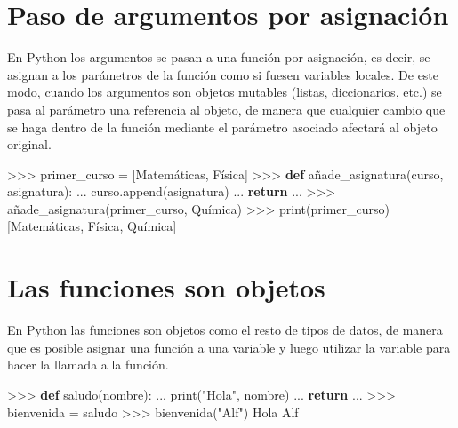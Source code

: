 \documentclass[
  spanish,
  a4paper,
]{scrreport}
\newenvironment{Shaded}{\begin{snugshade}}{\end{snugshade}}
\newcommand{\BuiltInTok}[1]{\textcolor[rgb]{0.00,0.23,0.31}{#1}}
\newcommand{\ControlFlowTok}[1]{\textcolor[rgb]{0.00,0.23,0.31}{\textbf{#1}}}
\newcommand{\KeywordTok}[1]{\textcolor[rgb]{0.00,0.23,0.31}{\textbf{#1}}}
\newcommand{\NormalTok}[1]{\textcolor[rgb]{0.00,0.23,0.31}{#1}}
\newcommand{\OperatorTok}[1]{\textcolor[rgb]{0.37,0.37,0.37}{#1}}
\newcommand{\StringTok}[1]{\textcolor[rgb]{0.13,0.47,0.30}{#1}}
\begin{document}
\section{Paso de argumentos por
asignación}\label{paso-de-argumentos-por-asignaciuxf3n}

En Python los argumentos se pasan a una función por asignación, es
decir, se asignan a los parámetros de la función como si fuesen
variables locales. De este modo, cuando los argumentos son objetos
mutables (listas, diccionarios, etc.) se pasa al parámetro una
referencia al objeto, de manera que cualquier cambio que se haga dentro
de la función mediante el parámetro asociado afectará al objeto
original.

\begin{Shaded}
\begin{Highlighting}[]
\OperatorTok{\textgreater{}\textgreater{}\textgreater{}}\NormalTok{ primer\_curso }\OperatorTok{=}\NormalTok{ [}\StringTok{\textquotesingle{}Matemáticas\textquotesingle{}}\NormalTok{, }\StringTok{\textquotesingle{}Física\textquotesingle{}}\NormalTok{]}
\OperatorTok{\textgreater{}\textgreater{}\textgreater{}} \KeywordTok{def}\NormalTok{ añade\_asignatura(curso, asignatura):}
\NormalTok{...     curso.append(asignatura)}
\NormalTok{...     }\ControlFlowTok{return}
\NormalTok{...}
\OperatorTok{\textgreater{}\textgreater{}\textgreater{}}\NormalTok{ añade\_asignatura(primer\_curso, }\StringTok{\textquotesingle{}Química\textquotesingle{}}\NormalTok{)}
\OperatorTok{\textgreater{}\textgreater{}\textgreater{}} \BuiltInTok{print}\NormalTok{(primer\_curso)}
\NormalTok{[}\StringTok{\textquotesingle{}Matemáticas\textquotesingle{}}\NormalTok{, }\StringTok{\textquotesingle{}Física\textquotesingle{}}\NormalTok{, }\StringTok{\textquotesingle{}Química\textquotesingle{}}\NormalTok{]}
\end{Highlighting}
\end{Shaded}

\section{Las funciones son objetos}\label{las-funciones-son-objetos}

En Python las funciones son objetos como el resto de tipos de datos, de
manera que es posible asignar una función a una variable y luego
utilizar la variable para hacer la llamada a la función.

\begin{Shaded}
\begin{Highlighting}[]
\OperatorTok{\textgreater{}\textgreater{}\textgreater{}} \KeywordTok{def}\NormalTok{ saludo(nombre):}
\NormalTok{...     }\BuiltInTok{print}\NormalTok{(}\StringTok{"Hola"}\NormalTok{, nombre)}
\NormalTok{...     }\ControlFlowTok{return}
\NormalTok{... }
\OperatorTok{\textgreater{}\textgreater{}\textgreater{}}\NormalTok{ bienvenida }\OperatorTok{=}\NormalTok{ saludo}
\OperatorTok{\textgreater{}\textgreater{}\textgreater{}}\NormalTok{ bienvenida(}\StringTok{"Alf"}\NormalTok{)}
\NormalTok{Hola Alf}
\end{Highlighting}
\end{Shaded}
\end{document}
